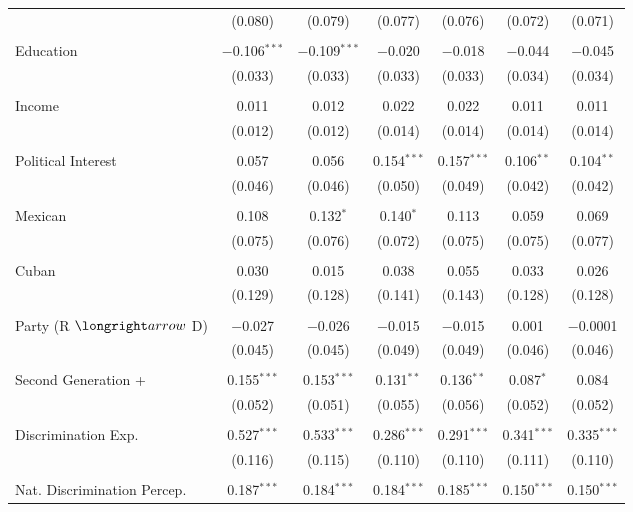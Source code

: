 \begin{table}[!htbp]
\begin{tabular}{@{\extracolsep{5pt}}lcccccc}
  & (0.080) & (0.079) & (0.077) & (0.076) & (0.072) & (0.071) \\ 
  & & & & & & \\ 
 Education & $-$0.106$^{***}$ & $-$0.109$^{***}$ & $-$0.020 & $-$0.018 & $-$0.044 & $-$0.045 \\ 
  & (0.033) & (0.033) & (0.033) & (0.033) & (0.034) & (0.034) \\ 
  & & & & & & \\ 
 Income & 0.011 & 0.012 & 0.022 & 0.022 & 0.011 & 0.011 \\ 
  & (0.012) & (0.012) & (0.014) & (0.014) & (0.014) & (0.014) \\ 
  & & & & & & \\ 
 Political Interest & 0.057 & 0.056 & 0.154$^{***}$ & 0.157$^{***}$ & 0.106$^{**}$ & 0.104$^{**}$ \\ 
  & (0.046) & (0.046) & (0.050) & (0.049) & (0.042) & (0.042) \\ 
  & & & & & & \\ 
 Mexican & 0.108 & 0.132$^{*}$ & 0.140$^{*}$ & 0.113 & 0.059 & 0.069 \\ 
  & (0.075) & (0.076) & (0.072) & (0.075) & (0.075) & (0.077) \\ 
  & & & & & & \\ 
 Cuban & 0.030 & 0.015 & 0.038 & 0.055 & 0.033 & 0.026 \\ 
  & (0.129) & (0.128) & (0.141) & (0.143) & (0.128) & (0.128) \\ 
  & & & & & & \\ 
 Party (R $\longright arrow$ D) & $-$0.027 & $-$0.026 & $-$0.015 & $-$0.015 & 0.001 & $-$0.0001 \\ 
  & (0.045) & (0.045) & (0.049) & (0.049) & (0.046) & (0.046) \\ 
  & & & & & & \\ 
 Second Generation + & 0.155$^{***}$ & 0.153$^{***}$ & 0.131$^{**}$ & 0.136$^{**}$ & 0.087$^{*}$ & 0.084 \\ 
  & (0.052) & (0.051) & (0.055) & (0.056) & (0.052) & (0.052) \\ 
  & & & & & & \\ 
 Discrimination Exp. & 0.527$^{***}$ & 0.533$^{***}$ & 0.286$^{***}$ & 0.291$^{***}$ & 0.341$^{***}$ & 0.335$^{***}$ \\ 
  & (0.116) & (0.115) & (0.110) & (0.110) & (0.111) & (0.110) \\ 
  & & & & & & \\ 
 Nat. Discrimination Percep. & 0.187$^{***}$ & 0.184$^{***}$ & 0.184$^{***}$ & 0.185$^{***}$ & 0.150$^{***}$ & 0.150$^{***}$ \\ 

\end{tabular}
\end{table}

